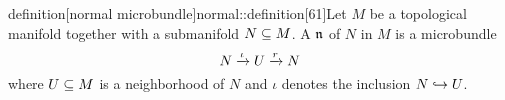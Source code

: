 \begin{mystatement}{definition}[normal microbundle]{normal::definition}[61]Let $M$ be a topological manifold together with a submanifold $N \subseteq{} M$. A  $\mathfrak{n}$ of $N$ in $M$ is a microbundle \[ N \xrightarrow{\iota} U \xrightarrow{r} N{} \] where $U \subseteq{} M$ is a neighborhood of $N$ and $\iota$ denotes the inclusion $N \hookrightarrow{} U$.
\end{mystatement}